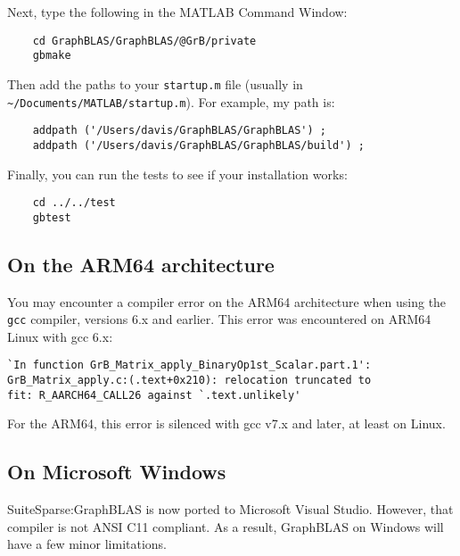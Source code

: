 \documentclass[12pt]{article}
\begin{document}
{Next, type the following in the MATLAB Command Window:

    {\small
    \begin{verbatim}
    cd GraphBLAS/GraphBLAS/@GrB/private
    gbmake \end{verbatim} }

Then add the paths to your \verb'startup.m' file (usually in
\verb'~/Documents/MATLAB/startup.m').  For example, my path is:

    {\small
    \begin{verbatim}
    addpath ('/Users/davis/GraphBLAS/GraphBLAS') ;
    addpath ('/Users/davis/GraphBLAS/GraphBLAS/build') ; \end{verbatim} }

Finally, you can run the tests to see if your installation works:

    {\small
    \begin{verbatim}
    cd ../../test
    gbtest \end{verbatim} }

\subsection{On the ARM64 architecture}

You may encounter a compiler error on the ARM64 architecture when using the
\verb'gcc' compiler, versions 6.x and earlier.  This error was encountered on
ARM64 Linux with gcc 6.x:

\begin{verbatim}
`In function GrB_Matrix_apply_BinaryOp1st_Scalar.part.1':
GrB_Matrix_apply.c:(.text+0x210): relocation truncated to
fit: R_AARCH64_CALL26 against `.text.unlikely'
\end{verbatim}

For the ARM64, this error is silenced with gcc v7.x and later, at least on
Linux.

\subsection{On Microsoft Windows}
\label{sec:windows}

SuiteSparse:GraphBLAS is now ported to Microsoft Visual Studio.  However, that
compiler is not ANSI C11 compliant. As a result, GraphBLAS on Windows will have
a few minor limitations.

}
\end{document}
